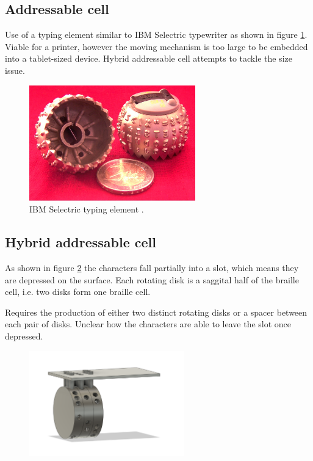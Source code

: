     \subsection{Addressable cell}
    Use of a typing element similar to IBM Selectric typewriter as shown in figure \ref{fig:IBM_Selectric_Globe_Wiki.jpg}. Viable for a printer, however the moving mechanism is too large to be embedded into a tablet-sized device. Hybrid addressable cell attempts to tackle the size issue.
    \begin{figure}[h]
    \centering
        \includegraphics[height=5cm]{figures/IBM_Selectric_Globe_Wiki.jpg}
    \caption{IBM Selectric typing element \cite{wiki:IBMSelectric}.}
    \label{fig:IBM_Selectric_Globe_Wiki.jpg}
    \end{figure}

    \subsection{Hybrid addressable cell}
    As shown in figure \ref{fig:rotation.png} the characters fall partially into a slot, which means they are depressed on the surface. Each rotating disk is a saggital half of the braille cell, i.e. two disks form one braille cell.

    Requires the production of either two distinct rotating disks or a spacer between each pair of disks. Unclear how the characters are able to leave the slot once depressed.
    \begin{figure}[h]
    \centering
        \includegraphics[width=0.6\textwidth]{figures/rotation.png}
    \caption{}
    \label{fig:rotation.png}
    \end{figure}

